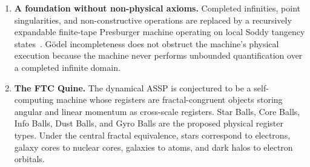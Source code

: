 \documentclass[11pt,a4paper]{article}
\begin{document}
\begin{enumerate}

  \item \textbf{A foundation without non-physical axioms.}
  Completed infinities, point singularities, and non-constructive operations are replaced by a recursively expandable finite-tape Presburger machine operating on local Soddy tangency states~\cite{Presburger1929}. Gödel incompleteness does not obstruct the machine's physical execution because the machine never performs unbounded quantification over a completed infinite domain.

  \item \textbf{The FTC Quine.}
  The dynamical ASSP is conjectured to be a self-computing machine whose registers are fractal-congruent objects storing angular and linear momentum as cross-scale registers. Star Balls, Core Balls, Info Balls, Dust Balls, and Gyro Balls are the proposed physical register types. Under the central fractal equivalence, stars correspond to electrons, galaxy cores to nuclear cores, galaxies to atoms, and dark halos to electron orbitals. 


\end{enumerate}
\end{document}
